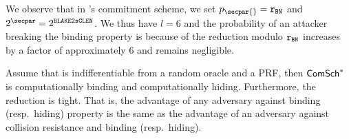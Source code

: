 \begin{remark}\label{instantiation:remark:rbn-blackcomplen}
	We observe that in \zeth's commitment scheme, we set $p_\secpar{} = \rBN$ and $2^\secpar = 2^\blakeCompLen$. We thus have $l = 6$ and the probability of an attacker breaking the binding property is because of the reduction modulo $\mathtt{r_{BN}}$ increases by a factor of approximately $6$ and remains negligible.
\end{remark}

\begin{corollary}
    Assume that  is indifferentiable from a random oracle and a PRF, then $\mathsf{ComSch}^*$ is computationally binding and computationally hiding. Furthermore, the reduction is tight. That is, the advantage of any \ppt{} adversary against binding (resp.~hiding) property is the same as the advantage of an adversary against collision resistance and binding (resp.~hiding).
\end{corollary}
